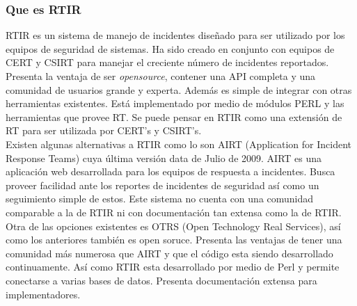 \subsubsection{Que es RTIR}
RTIR es un sistema de manejo de incidentes diseñado para ser utilizado por los 
equipos de seguridad de sistemas. Ha sido creado en conjunto con equipos de CERT 
y CSIRT para manejar el creciente número de incidentes reportados.
Presenta la ventaja de ser \textit{opensource}, contener una API completa y una comunidad 
de usuarios grande y experta. Además es simple de integrar con otras 
herramientas existentes. Está implementado por medio de módulos PERL y las 
herramientas que provee RT. Se puede pensar en RTIR como una extensión de RT 
para ser utilizada por CERT's y CSIRT's.\\

Existen algunas alternativas a RTIR como lo son AIRT (Application for Incident Response Teams) 
cuya última versión data de Julio de 2009. AIRT es una aplicación web 
desarrollada para los equipos de respuesta a incidentes. Busca proveer facilidad 
ante los reportes de incidentes de seguridad así como un seguimiento simple de 
estos. Este sistema no cuenta con una comunidad comparable a la de RTIR ni 
con documentación tan extensa como la de RTIR.\\

Otra de las opciones existentes es OTRS (Open Technology Real Services), así 
como los anteriores también es open soruce. Presenta las ventajas de tener una 
comunidad más numerosa que AIRT y que el código esta siendo desarrollado continuamente. 
Así como RTIR esta desarrollado por medio de Perl y permite conectarse a varias 
bases de datos. Presenta documentación extensa para implementadores.